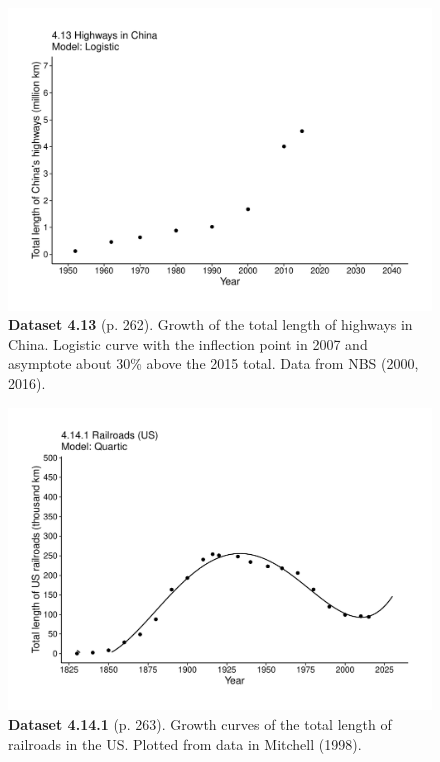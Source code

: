\documentclass[aps,rmp,preprint,superscriptaddress,10pt,onecolumn]{article}
\begin{document}
\clearpage
\begin{figure}[h]
\includegraphics[width=\textwidth]{output/figs-ggplot/4.13.pdf}
\caption*{\textbf{Dataset 4.13} (p. 262). Growth of the total length of highways in China. Logistic curve with the inflection point in 2007 and asymptote about 30\% above the 2015 total. Data from NBS (2000, 2016).}
\end{figure}
	
\clearpage
\begin{figure}[h]
\includegraphics[width=\textwidth]{output/figs-ggplot/4.14.1.pdf}
\caption*{\textbf{Dataset 4.14.1} (p. 263). Growth curves of the total length of railroads in the US. Plotted from data in Mitchell (1998).}
\end{figure}
	
\end{document}
